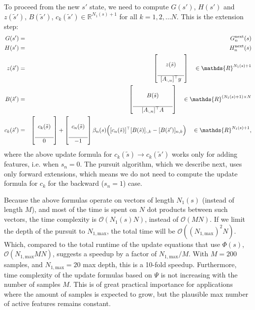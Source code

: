 \documentclass[letter,10pt,oneside]{article}
\newcommand{\bal}{\begin{eqnarray}}
\newcommand{\eal}{\end{eqnarray}}
\newcommand{\+}{^\dagger}
\newcommand{\T}{^\top}
\begin{document}
To proceed from the new $s'$ state, we need to compute $G(s')$, $H(s')$ and $z(\tilde{s}')$, $B(\tilde{s}')$, $c_k(\tilde{s}')\in \mathds{R}^{N_1(s) + 1}$ for all $k = 1,2,\ldots N$. This is the extension step:
\bal
  G(s') &=& G^\text{next}_n(s) \nonumber \\
  H(s') &=& H^\text{next}_n(s) \nonumber \\
  z(\tilde{s}') &=& \left[\begin{array}{c}
    \\
    z(\tilde s)\\
    \\
    \hline
    [A_{:,n}]\T y 
  \end{array}\right] \quad \in \mathds{R}^{N_1(s) + 1} \nonumber \\
  B(\tilde{s}') &=& \left[\begin{array}{ccc}
    & &  \\
    & B(\tilde{s}) & \\
    & & \\
    \hline
    & [A_{:,n}]\T A
  \end{array}\right] \quad \in \mathds{R}^{(N_1(s) + 1)\times N} \nonumber\\
  c_k(\tilde{s}') &=& 
  \left[\begin{array}{c}
    \\
    c_k(\tilde s) \\
    \\
    \hline
    0
  \end{array}\right] 
  + 
  \left[\begin{array}{c}
    \\
    c_n(\tilde s) \\
    \\
    \hline
    -1
  \end{array}\right] \beta_n(s)\Big([c_n(\tilde s)]\T [B(\tilde s)]_{:, k} - [B(\tilde{s}')]_{n,k}\Big) \quad \in \mathds{R}^{N_1(s)+1},
\eal
where the above update formula for $c_k(\tilde s) \rightarrow c_k(\tilde{s}')$ works only for adding features, i.e. when $s_n = 0$. The pursuit algorithm, which we describe next, uses only forward extensions, which means we do not need to compute the update formula for $c_k$ for the backward ($s_n = 1$) case.

Because the above formulas operate on vectors of length $N_1(s)$ (instead of length $M$), and most of the time is spent on $N$ dot products between such vectors, the time complexity is $\mathcal{O}(N_1(s) N)$, instead of $\mathcal{O}(MN)$. If we limit the depth of the pursuit to $N_{1,\text{max}}$, the total time will be $\mathcal{O}((N_{1,\text{max}})^2 N)$. Which, compared to the total runtime of the update equations that use $\Phi(s)$, $\mathcal{O}(N_{1,\text{max}} M N)$, suggests a speedup by a factor of $N_{1,\text{max}} / M$. With $M = 200$ samples, and $N_{1,\text{max}} = 20$ max depth, this is a 10-fold speedup. Furthermore, time complexity of the update formulas based on $\Psi$ is not increasing with the number of samples $M$. This is of great practical importance for applications where the amount of samples is expected to grow, but the plausible max number of active features remains constant.
\end{document}
